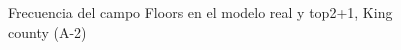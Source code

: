 \begin{figure}[H]
    \centering
    
    \caption{Frecuencia del campo Floors en el modelo real y top2+1, King county (A-2)}
    \label{frecuency-top2+1-floors}
\end{figure}